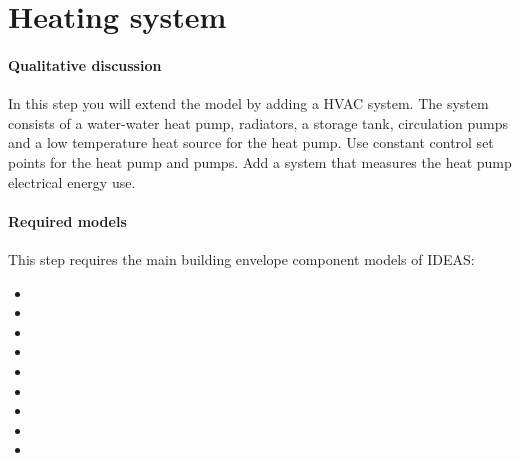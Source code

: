 \documentclass[10pt,a4paper]{article}
\begin{document}
\section{Heating system}
\paragraph{Qualitative discussion}
In this step you will extend the model  
by adding a HVAC system.
The system consists of a water-water heat pump, radiators, 
a storage tank,
circulation pumps and a low temperature heat source for the heat pump.
Use constant control set points for the heat pump and pumps.
Add a system that measures the heat pump electrical energy use.\\

\paragraph{Required models}
This step requires the main building envelope component models of IDEAS:
\begin{itemize}
\item {}
\item {}
\item {}
\item {}
\item {}
\item {}
\item {}
\item {}
\item {}
\end{itemize}
\end{document}
